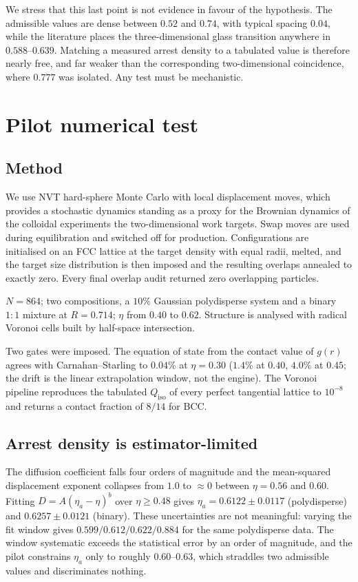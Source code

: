 \documentclass[11pt]{article}
\begin{document}
We stress that this last point is not evidence in favour of the hypothesis. The
admissible values are dense between $0.52$ and $0.74$, with typical spacing
$0.04$, while the literature places the three-dimensional glass transition
anywhere in $0.588$--$0.639$. Matching a measured arrest density to a tabulated
value is therefore nearly free, and far weaker than the corresponding
two-dimensional coincidence, where $0.777$ was isolated. Any test must be
mechanistic.

\section{Pilot numerical test}
\label{sec:pilot}

\subsection{Method}

We use NVT hard-sphere Monte Carlo with local displacement moves, which provides
a stochastic dynamics standing as a proxy for the Brownian dynamics of the
colloidal experiments the two-dimensional work targets. Swap moves are used
during equilibration and switched off for production. Configurations are
initialised on an FCC lattice at the target density with equal radii, melted, and
the target size distribution is then imposed and the resulting overlaps annealed
to exactly zero. Every final overlap audit returned zero overlapping particles.

$N=864$; two compositions, a $10\%$ Gaussian polydisperse system and a binary
$1{:}1$ mixture at $R=0.714$; $\eta$ from $0.40$ to $0.62$. Structure is analysed
with radical Voronoi cells built by half-space intersection.

Two gates were imposed. The equation of state from the contact value of $g(r)$
agrees with Carnahan--Starling to $0.04\%$ at $\eta=0.30$ ($1.4\%$ at $0.40$,
$4.0\%$ at $0.45$; the drift is the linear extrapolation window, not the engine).
The Voronoi pipeline reproduces the tabulated $Q_{\mathrm{iso}}$ of every perfect
tangential lattice to $10^{-8}$ and returns a contact fraction of $8/14$ for BCC.

\subsection{Arrest density is estimator-limited}

The diffusion coefficient falls four orders of magnitude and the mean-squared
displacement exponent collapses from $1.0$ to $\approx0$ between $\eta=0.56$ and
$0.60$. Fitting $D = A(\eta_a-\eta)^b$ over $\eta\geq0.48$ gives
$\eta_a=0.6122\pm0.0117$ (polydisperse) and $0.6257\pm0.0121$ (binary). These
uncertainties are not meaningful: varying the fit window gives
$0.599/0.612/0.622/0.884$ for the same polydisperse data. The window systematic
exceeds the statistical error by an order of magnitude, and the pilot constrains
$\eta_a$ only to roughly $0.60$--$0.63$, which straddles two admissible values
and discriminates nothing.
\end{document}
